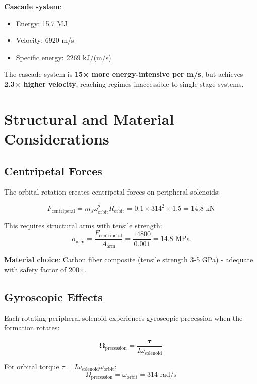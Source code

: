 \documentclass[12pt,a4paper]{article}
\begin{document}
\textbf{Cascade system}:
\begin{itemize}
\item Energy: 15.7 MJ
\item Velocity: 6920 m/s
\item Specific energy: 2269 kJ/(m/s)
\end{itemize}

The cascade system is \textbf{15× more energy-intensive per m/s}, but achieves \textbf{2.3× higher velocity}, reaching regimes inaccessible to single-stage systems.

\section{Structural and Material Considerations}

\subsection{Centripetal Forces}

The orbital rotation creates centripetal forces on peripheral solenoids:

\begin{equation}
F_{\text{centripetal}} = m_s \omega_{\text{orbit}}^2 R_{\text{orbit}} = 0.1 \times 314^2 \times 1.5 = 14.8 \text{ kN}
\end{equation}

This requires structural arms with tensile strength:
\begin{equation}
\sigma_{\text{arm}} = \frac{F_{\text{centripetal}}}{A_{\text{arm}}} = \frac{14800}{0.001} = 14.8 \text{ MPa}
\end{equation}

\textbf{Material choice}: Carbon fiber composite (tensile strength 3-5 GPa) - adequate with safety factor of 200×.

\subsection{Gyroscopic Effects}

Each rotating peripheral solenoid experiences gyroscopic precession when the formation rotates:

\begin{equation}
\boldsymbol{\Omega}_{\text{precession}} = \frac{\boldsymbol{\tau}}{I \omega_{\text{solenoid}}}
\end{equation}

For orbital torque $\tau = I \omega_{\text{solenoid}} \omega_{\text{orbit}}$:
\begin{equation}
\Omega_{\text{precession}} = \omega_{\text{orbit}} = 314 \text{ rad/s}
\end{equation}
\end{document}
